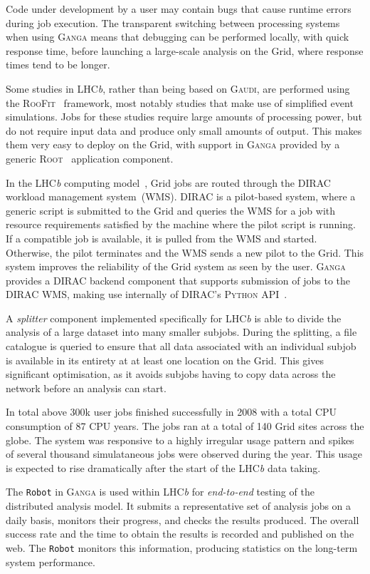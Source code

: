 \documentclass{elsart}
\def\lhcb {LHC{\em b\/}\xspace}
\def\dirac{DIRAC\xspace}
\def\ganga {\textsc{Ganga}\xspace}
\def\python {\textsc{Python}\xspace}
\def\root {\textsc{Root}\xspace}
\def\gaudi {\textsc{Gaudi}\xspace}
\def\grid {Grid\xspace}
\def\roofit{\textsc{RooFit}\xspace}
\newcommand{\code}[1]{\texttt{#1}}
\begin{document}
Code under development by a user may contain bugs that cause
runtime errors during job execution. The transparent switching between
processing systems when using \ganga means that debugging can be
performed locally, with quick response time, before launching a large-scale
analysis on the \grid, where response times tend to be longer.

Some studies in \lhcb, rather than being based on \gaudi, are performed using
the \roofit~\cite{RooFit} framework, most notably studies that make use of
simplified event simulations.   Jobs for these studies require large amounts
of processing power, but do not require
input data and produce only small amounts of output. This makes them
very easy to deploy on the \grid, with support in \ganga provided by a
generic \root~\cite{ROOT} application component.

In the \lhcb computing model~\cite{lhcb:2005jj}, \grid jobs are routed
through the
\dirac~\cite{DIRAC} workload management system~(WMS). \dirac is a pilot-based
system, where a generic script is submitted to the \grid and queries the
WMS for a job with resource requirements satisfied by the machine where the
pilot script is running.  If a compatible job is available, it is
pulled from the WMS
and started.  Otherwise, the pilot 
terminates and the WMS sends a new pilot to the \grid. This system 
improves the reliability of the \grid system as seen by the user. \ganga
provides a \dirac backend
component that supports submission of jobs to the \dirac
WMS, making use internally of \dirac's \python API~\cite{DIRACAPI}.

A \emph{splitter} component implemented specifically for \lhcb is able to divide
the
analysis of a large dataset into many smaller subjobs. During the splitting,
a file catalogue is queried to ensure that all data associated with an
individual subjob is
available in its entirety at at least one location on the \grid. This gives
significant optimisation, as it avoids subjobs having to copy data across the
network
before an analysis can start.

In total above 300k user jobs finished successfully in 2008 with a total
CPU consumption of 87 CPU years. The jobs ran at a total of 140 Grid
sites across the globe. The system was responsive to a highly irregular
usage pattern and spikes of several thousand simulataneous jobs were
observed during the year. This usage is expected to rise dramatically after the start of the
\lhcb data taking.

The \code{Robot} in \ganga is used within \lhcb for \emph{end-to-end} testing
of the distributed analysis model. It submits a representative set of
analysis jobs on a daily basis, monitors their progress, and checks 
the results produced. The overall success rate and the time to obtain
the results is recorded and published on the web. The
\code{Robot} monitors this information, producing statistics on the
long-term system performance.
\end{document}
